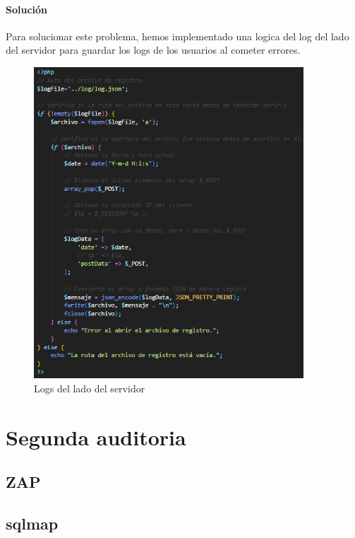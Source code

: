 \documentclass{report}
\begin{document}
                \subsubsection{Solución}
                    Para solucionar este problema, hemos implementado una logica del log del lado del servidor para guardar los logs de los usuarios al cometer errores.
                    \begin{figure}[H]
                        \centering
                        \includegraphics[width=0.9\textwidth]{./img/vulnerabilidades/3.9/2.2.png}
                        \caption{Logs del lado del servidor}
                    \end{figure}
                    
            \clearpage
    \chapter{Segunda auditoria}
        \section{ZAP}
        \clearpage
        \section{sqlmap}
        \clearpage
\end{document}
